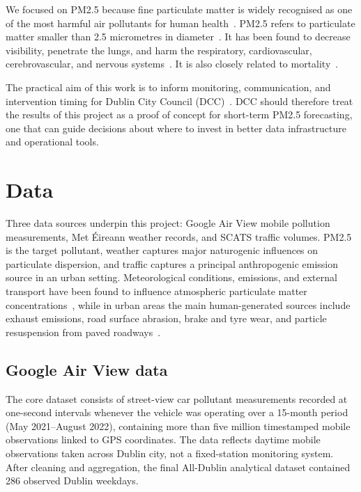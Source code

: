 \documentclass[11pt,a4paper]{article}
\begin{document}
	We focused on PM2.5 because fine particulate matter is widely recognised as one of the most harmful air pollutants for human health~\cite{ourworldindata}. PM2.5 refers to particulate matter smaller than 2.5 micrometres in diameter~\cite{yang2020}. It has been found to decrease visibility, penetrate the lungs, and harm the respiratory, cardiovascular, cerebrovascular, and nervous systems~\cite{yang2020}. It is also closely related to mortality~\cite{yang2020}.
	
	The practical aim of this work is to inform monitoring, communication, and intervention timing for Dublin City Council (DCC)~\cite{dcc}. DCC should therefore treat the results of this project as a proof of concept for short-term PM2.5 forecasting, one that can guide decisions about where to invest in better data infrastructure and operational tools.
	
	\section{Data}
	
	Three data sources underpin this project: Google Air View mobile pollution measurements, Met \'Eireann weather records, and SCATS traffic volumes. PM2.5 is the target pollutant, weather captures major naturogenic influences on particulate dispersion, and traffic captures a principal anthropogenic emission source in an urban setting. Meteorological conditions, emissions, and external transport have been found to influence atmospheric particulate matter concentrations~\cite{yang2020}, while in urban areas the main human-generated sources include exhaust emissions, road surface abrasion, brake and tyre wear, and particle resuspension from paved roadways~\cite{karagulian2015}.
	
	\subsection*{Google Air View data}
	
	The core dataset consists of street-view car pollutant measurements recorded at one-second intervals whenever the vehicle was operating over a 15-month period (May 2021--August 2022), containing more than five million timestamped mobile observations linked to GPS coordinates. The data reflects daytime mobile observations taken across Dublin city, not a fixed-station monitoring system. After cleaning and aggregation, the final All-Dublin analytical dataset contained 286 observed Dublin weekdays.
	
\end{document}
